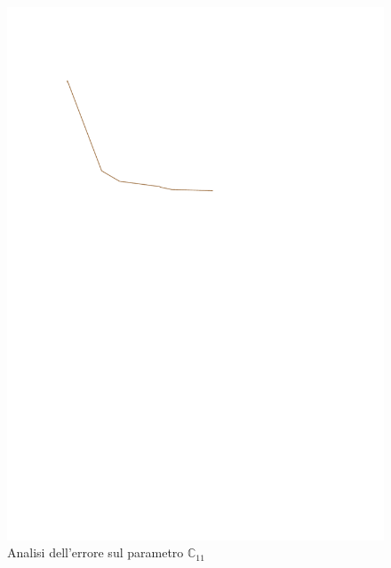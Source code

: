 \documentclass[a4paper,num-refs]{oup-contemporary}
\begin{document}
\begin{figure}[bt!] %
	\centering
	\includegraphics[width=\linewidth]{test_data.pdf}
	\caption{Analisi dell'errore sul parametro $\mathbb C_{11}$}\label{fig:convergence}
\end{figure}
\end{document}
